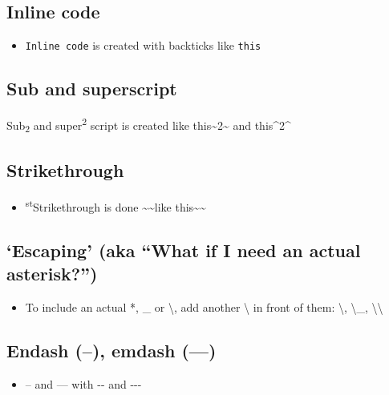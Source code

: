 \documentclass[a4paper, nobind]{templates/ociamthesis}
\providecommand{\tightlist}{%
  \setlength{\itemsep}{0pt}\setlength{\parskip}{0pt}}
\renewcommand{\st}{\textsuperscript{st}}
\begin{document}
\subsection{Inline code}\label{inline-code}

\begin{itemize}
\tightlist
\item
  \texttt{Inline\ code} is created with backticks like \texttt{\textasciigrave{}this\textasciigrave{}}
\end{itemize}

\subsection{Sub and superscript}\label{sub-and-superscript}

Sub\textsubscript{2} and super\textsuperscript{2} script is created like this\textasciitilde2\textasciitilde{} and this\^{}2\^{}

\subsection{Strikethrough}\label{strikethrough}

\begin{itemize}
\tightlist
\item
  \st{Strikethrough} is done \textasciitilde\textasciitilde like this\textasciitilde\textasciitilde{}
\end{itemize}

\subsection{`Escaping' (aka ``What if I need an actual asterisk?'')}\label{escaping-aka-what-if-i-need-an-actual-asterisk}

\begin{itemize}
\tightlist
\item
  To include an actual *, \_ or \textbackslash, add another \textbackslash{} in front of them: \textbackslash*, \textbackslash\_, \textbackslash\textbackslash{}
\end{itemize}

\subsection{Endash (--), emdash (---)}\label{endash-emdash}

\begin{itemize}
\tightlist
\item
  -- and --- with -\/- and -\/-\/-
\end{itemize}
\end{document}
